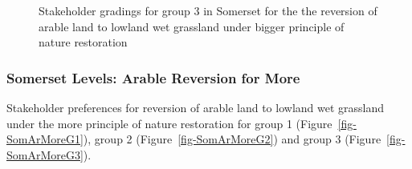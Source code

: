 \documentclass[
  12pt,
  letterpaper,
  DIV=11,
  numbers=noendperiod]{scrartcl}
\begin{document}
\begin{figure}[H]


\caption{\label{fig-SomArBigG3}Stakeholder gradings for group 3 in
Somerset for the the reversion of arable land to lowland wet grassland
under bigger principle of nature restoration}

\end{figure}%

\newpage{}

\subsubsection{Somerset Levels: Arable Reversion for
More}\label{somerset-levels-arable-reversion-for-more}

Stakeholder preferences for reversion of arable land to lowland wet
grassland under the more principle of nature restoration for group 1
(Figure~\ref{fig-SomArMoreG1}), group 2 (Figure~\ref{fig-SomArMoreG2})
and group 3 (Figure~\ref{fig-SomArMoreG3}).
\end{document}
